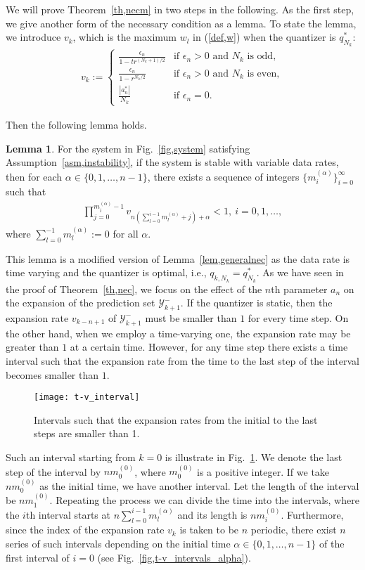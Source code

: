 \documentclass[a4paper, 11pt]{article}
\newcommand{\calY}{\mathcal{Y}}
\theoremstyle{definition}
\newtheorem{lem}{Lemma}
\newcommand{\fref}[1]{Fig.~\ref{#1}}
\begin{document}
We will prove Theorem~\ref{th,necm} in two steps in the following.
As the first step, we give another form of the necessary condition as a lemma.
To state the lemma, we introduce $v_k$, which is the maximum $w_l$ in (\ref{def,w})
when the quantizer is $q_{N_k}^*$:
\begin{align}
 v_k:=\begin{cases}
  \frac{\epsilon_n}{1-tr^{(N_{k}+1)/2}}
   & \text{if } \epsilon_n>0\text{ and }N_{k}\text{ is odd},\\
  \frac{\epsilon_n}{1-r^{N_{k}/2}}
   & \text{if } \epsilon_n>0\text{ and }N_{k}\text{ is even},\\
  \frac{|a_n^*|}{N_{k}} & \text{if }\epsilon_n=0.
 \end{cases}\label{def,v}
\end{align}

Then the following lemma holds.
\begin{lem}\label{lem,necm_pre}
 For the system in \fref{fig,system} satisfying Assumption~\ref{asm,instability},
if the system is stable with variable data rates,
then for each $\alpha\in\{0,1,\dots,n-1\}$, there exists a sequence of integers
$\{m^{(\alpha)}_{i}\}_{i=0}^\infty$ such that
\begin{align}
 \prod_{j=0}^{m^{(\alpha)}_{i}-1} v_{n(\sum_{l=0}^{i-1}m^{(\alpha)}_{l}+j)+\alpha}<1,\
 i=0,1,\dots,
 \label{necm_prod}
\end{align}
where $\sum_{l=0}^{-1}m^{(\alpha)}_{l}:=0$ for all $\alpha$.
\end{lem}

This lemma is a modified version of Lemma~\ref{lem,generalnec} as the
data rate is time varying and the quantizer is optimal, i.e., $q_{k,N_k}=q^*_{N_k}$.
As we have seen in the proof of Theorem~\ref{th,nec}, we focus on the effect
of the $n$th parameter $a_{n}$ on the expansion of the prediction set $\calY_{k+1}^-$.
If the quantizer is static, then the expansion rate
$v_{k-n+1}$ of $\calY_{k+1}^-$ must be smaller than $1$ for every time step.
On the other hand, when we employ a time-varying one, the expansion rate
may be greater than $1$ at a certain time.
However, for any time step there exists a time interval such that
the expansion rate from the time to the last step of the interval
becomes smaller than $1$.
\begin{figure}[t]
 \centering
 \texttt{[image: t-v\_interval]}
 \caption{Intervals such that the expansion rates from the initial
 to the last steps are smaller than 1.}
 \label{fig,t-v_interval}
\end{figure}
Such an interval starting from $k=0$ is illustrate in \fref{fig,t-v_interval}.
We denote the last step of the interval by $nm^{(0)}_{0}$, where $m^{(0)}_0$ is a
positive integer.
If we take $nm^{(0)}_0$ as the initial time, we have another interval.
Let the length of the interval be $nm^{(0)}_1$.
Repeating the process we can divide the time into the intervals, where
the $i$th interval starts at $n\sum_{l=0}^{i-1}m^{(\alpha)}_{l}$ and
its length is $nm^{(0)}_i$.
Furthermore, since the index of the expansion rate $v_k$ is taken to be
$n$ periodic, there exist $n$ series of such intervals depending on the initial
time $\alpha\in\{0,1,\dots,n-1\}$ of the first interval of $i=0$
(see \fref{fig,t-v_intervals_alpha}).
\end{document}
